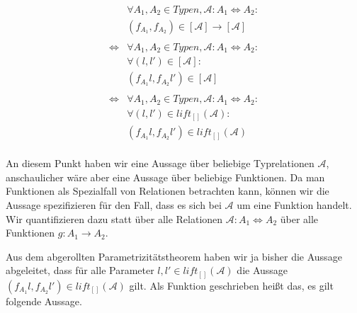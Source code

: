 \begin{align*}
&\forall A_1, A_2 \in Typen, \mathcal{A} : A_1 \Leftrightarrow A_2: \\
&(f_{A_1}, f_{A_2}) \in [\mathcal{A}] \rightarrow [\mathcal{A}] \\
& \\
\Leftrightarrow &
\forall A_1, A_2 \in Typen, \mathcal{A} : A_1 \Leftrightarrow A_2: \\
& \forall (l, l') \in [\mathcal{A}]: \\
&(f_{A_1} l, f_{A_2} l') \in [\mathcal{A}] \\
& \\
\Leftrightarrow &
\forall A_1, A_2 \in Typen, \mathcal{A} : A_1 \Leftrightarrow A_2: \\
& \forall (l, l') \in lift_{[]}(\mathcal{A}): \\
& (f_{A_1} l, f_{A_2} l') \in lift_{[]}(\mathcal{A}) \\
\end{align*}


An diesem Punkt haben wir eine Aussage über beliebige Typrelationen $\mathcal{A}$, anschaulicher wäre aber eine Aussage
über beliebige Funktionen. Da man Funktionen als Spezialfall von Relationen betrachten kann, können wir die Aussage
spezifizieren für den Fall, dass es sich bei $\mathcal{A}$ um eine Funktion handelt. Wir quantifizieren dazu statt
über alle Relationen $\mathcal{A} : A_1 \Leftrightarrow A_2$ über alle Funktionen $g : A_1 \rightarrow A_2$.

Aus dem abgerollten Parametrizitätstheorem haben wir ja bisher die Aussage abgeleitet, dass für alle Parameter $l, l' \in lift_{[]}(\mathcal{A})$
die Aussage $(f_{A_1} l, f_{A_2} l') \in lift_{[]}(\mathcal{A})$ gilt. Als Funktion geschrieben heißt das, es gilt folgende Aussage.

